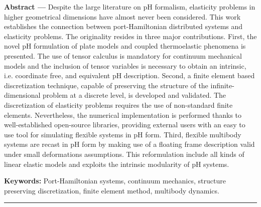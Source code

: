 \begin{vcenterpage}
{\large\textbf{Abstract ---}}  
Despite the large literature on pH formalism, elasticity problems in higher geometrical dimensions have almost never been considered.  This work establishes the connection between port-Hamiltonian distributed systems and elasticity problems. The originality resides in three major contributions. First, the novel pH formulation of plate models and coupled thermoelastic phenomena is presented. The use of tensor calculus is mandatory for continuum mechanical models and the inclusion of tensor variables is necessary to obtain an intrinsic, i.e. coordinate free, and equivalent pH description. Second, a finite element based discretization technique, capable of preserving the structure of the infinite-dimensional problem at a discrete level, is developed and validated. The discretization of elasticity problems requires the use of non-standard finite elements. Nevertheless, the numerical implementation is performed thanks to well-established open-source libraries, providing external users with an easy to use tool for simulating flexible systems in pH form. Third, flexible multibody systems are recast in pH form by making use of a floating frame description valid under small deformations assumptions. This reformulation include all kinds of linear elastic models and exploits the intrinsic modularity of pH systems.

{\large\textbf{Keywords:}}
    Port-Hamiltonian systems, continuum mechanics, structure preserving discretization, finite element method, multibody dynamics.
\\
\noindent\rule[2pt]{\textwidth}{0.5pt}
\end{vcenterpage}


